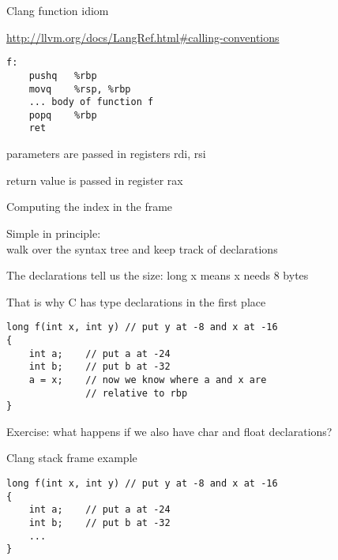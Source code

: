 \documentclass[landscape]{beamer}
\begin{document}
\begin{frame}[fragile]{Clang function idiom}

\url{http://llvm.org/docs/LangRef.html#calling-conventions}

\begin{verbatim}
f:
	pushq	%rbp
	movq	%rsp, %rbp
    ... body of function f
	popq	%rbp
	ret
\end{verbatim}

parameters are passed in registers rdi, rsi

return value is passed in register rax
\end{frame}



\begin{frame}[fragile]{Computing the index in the frame}

Simple in principle: 
\\
walk over the syntax tree and keep track of declarations

The declarations tell us the size: long x means x needs 8 bytes

That is why C has type declarations in the first place

\begin{verbatim}
long f(int x, int y) // put y at -8 and x at -16
{
    int a;    // put a at -24
    int b;    // put b at -32
    a = x;    // now we know where a and x are 
              // relative to rbp
}    
\end{verbatim}

Exercise: what happens if we also have char and float declarations?    
\end{frame}

\begin{frame}[fragile]{Clang stack frame example}
\begin{verbatim}
long f(int x, int y) // put y at -8 and x at -16
{
    int a;    // put a at -24
    int b;    // put b at -32
    ...
}
\end{verbatim}
  
  
\end{frame} 
\end{document}
